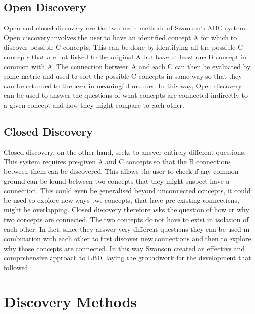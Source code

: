 \documentclass{l4proj}
\begin{document}
\subsection{Open Discovery}

Open and closed discovery are the two main methods of Swanson's ABC system. Open discovery involves the user to have an identified concept A for which to discover possible C concepts. This can be done by identifying all the possible C concepts that are not linked to the original A but have at least one B concept in common with A. The connection between A and each C can then be evaluated by some metric and used to sort the possible C concepts in some way so that they can be returned to the user in meaningful manner. In this way, Open discovery can be used to answer the questions of what concepts are connected indirectly to a given concept and how they might compare to each other. \\

\subsection{Closed Discovery}

Closed discovery, on the other hand, seeks to answer entirely different questions. This system requires pre-given A and C concepts so that the B connections between them can be discovered. This allows the user to check if any common ground can be found between two concepts that they might suspect have a connection. This could even be generalised beyond unconnected concepts, it could be used to explore new ways two concepts, that have pre-existing connections, might be overlapping. Closed discovery therefore asks the question of how or why two concepts are connected. The two concepts do not have to exist in isolation of each other. In fact, since they answer very different questions they can be used in combination with each other to first discover new connections and then to explore why those concepts are connected. In this way Swanson created an effective and comprehensive approach to LBD, laying the groundwork for the development that followed. \\ 

\section{Discovery Methods}
\end{document}
